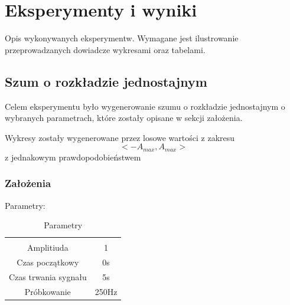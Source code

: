 \documentclass{article}
\begin{document}
\section{Eksperymenty i wyniki}

Opis wykonywanych eksperymentw. Wymagane jest ilustrowanie przeprowadzanych dowiadcze wykresami oraz tabelami.


\subsection{Szum o rozkładzie jednostajnym} \label{szumjednostajny} 
    Celem eksperymentu było wygenerowanie szumu o rozkładzie jednostajnym o wybranych parametrach,
    które zostały opisane w sekcji założenia.

    
        Wykresy zostały wygenerowane przez losowe wartości z zakresu \[<-A_{max}, A_{max}>\]
        z jednakowym prawdopodobieństwem
    \noindent
    \subsubsection{Założenia}
    Parametry:
    
    \begin{table}[h!]
        \centering
        \vspace{0.2cm}
        \begin{tabular}{|c|c|}
            \hline\hline\\[-0.4cm]
            Amplitiuda & 1  \\
            \hline
            Czas początkowy & 0s  \\
            \hline
            Czas trwania sygnału & 5s  \\
            \hline
            Próbkowanie & 250Hz \\
            \hline
        \end{tabular}
        \caption{Parametry}
        \label{szumjednostajny}
    \end{table}
    \FloatBarrier
\end{document}
